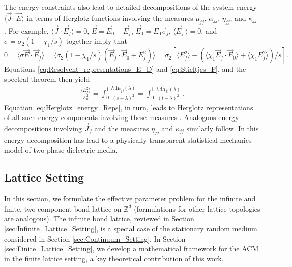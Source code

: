 \documentclass{cmslatex}
\renewcommand{\d}{\text{d}}
\begin{document}
The energy constraints also lead to detailed decompositions of the
system energy $\langle\vec{J}\cdot\vec{E}\rangle$ in terms of Herglotz functions
involving the measures $\mu_{jj}$, $\alpha_{jj}$, $\eta_{jj}$, and $\kappa_{jj}$
\cite{Murphy:JMP:063506,Murphy:PHD_Thesis}. For 
example, $\langle\vec{J}\cdot\vec{E}_f\rangle=0$, $\vec{E}=\vec{E}_0+\vec{E}_f$, 
$\vec{E}_0=E_0\vec{e}_j$, $\langle\vec{E}_f\,\rangle=0$, and $\sigma=\sigma_2(1-\chi_1/s)$ together
imply that $0=\langle\sigma\vec{E}\cdot\vec{E}_f\rangle=\langle\sigma_2(1-\chi_1/s)(\vec{E}_f\cdot\vec{E}_0+E_f^2)\rangle 
=\sigma_2\left[\langle E_f^2\rangle- (\langle\chi_1\vec{E}_f\cdot\vec{E}_0\rangle+\langle\chi_1E_f^2\rangle)/s\right].$
Equations \eqref{eq:Resolvent_representations_E_D} and
\eqref{eq:Stieltjes_F}, and the spectral theorem \cite{Reed-1980} then
yield \cite{Murphy:JMP:063506}  
%
\begin{align}\label{eq:Herglotz_energy_Reps}
 \frac{\langle E_f^2\rangle}{E_0^2}=\int_0^1 \frac{\lambda\,\d\mu_{jj}(\lambda)}{(s-\lambda)^2}
           =\int_0^1 \frac{\lambda\,\d\alpha_{jj}(\lambda)}{(t-\lambda)^2}\,. 
\end{align}
%
Equation \eqref{eq:Herglotz_energy_Reps}, in turn, leads to Herglotz
representations of all such energy components involving
these measures \cite{Murphy:PHD_Thesis}. Analogous energy
decompositions involving $\vec{J}_f$ and the measures $\eta_{jj}$ and
$\kappa_{jj}$ similarly follow. In \cite{Murphy:PHD_Thesis} this
energy decomposition has lead to a physically transparent statistical
mechanics model of two-phase dielectric media.


\subsection{Lattice Setting}
\label{sec:Lattice_Setting}
%
In this section, we formulate the effective parameter problem for the
infinite and finite, two-component bond lattice on $\mathbb{Z}^d$
(formulations for other lattice topologies are analogous). The
infinite bond lattice, reviewed in Section
\ref{sec:Infinite_Lattice_Setting}, is a special case of the
stationary random medium considered in Section
\ref{sec:Continuum_Setting}. In Section
\ref{sec:Finite_Lattice_Setting}, we develop a mathematical framework
for the ACM in the finite lattice setting, a key theoretical
contribution of this work. 
\end{document}

